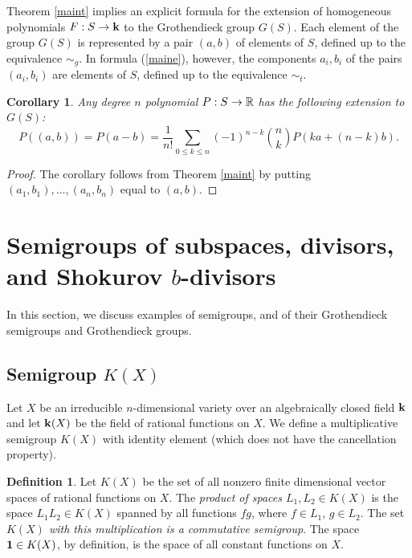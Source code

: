 \documentclass[11pt]{article}
\theoremstyle{plain}
\newtheorem{corollary}[theorem]{Corollary}
\theoremstyle{definition}
\newtheorem{definition}[theorem]{Definition}
\begin{document}
Theorem \ref{maint} implies an explicit formula for the extension of
homogeneous polynomials $F:S\to \bold k$ to the Grothendieck group
$G(S)$.  Each element of the group $G(S)$ is represented by a pair $(a,b)$ of elements of $S$, defined up to the equivalence $\sim_g$. In formula (\ref{maine}), however, the components $a_i,b_i$ of the pairs $(a_i,b_i)$ are elements of $S$, defined up to the equivalence $\sim_t$.

\begin{corollary}\label{ongindex} Any degree $n$ polynomial $P:S\to \Bbb
R$ has the following extension to~$G(S)$:
\begin{equation}\label{gindex}
P((a,b))=P(a-b)= \frac{1}{n!} \sum_{0\leq k\leq n} (-1)^{n-k}{n\choose
k}P( ka +(n-k)b).
\end{equation}

\end{corollary}

\begin{proof} The corollary  follows from Theorem \ref{maint} by putting
$(a_1,b_1),\dots,(a_n,b_n)$ equal to $(a,b)$.
\end{proof}




\section{Semigroups of  subspaces,  divisors, and Shokurov $b$-divisors}\label{sect3}

In this section, we discuss examples of semigroups, and of their Grothendieck semigroups and Grothendieck groups.


\subsection{Semigroup $K(X)$} Let $X$ be  an irreducible $n$-dimensional  variety over an algebraically closed field $\bold k$ and let  $\bold k (X)$ be the field  of rational functions on $X$. We define a  multiplicative   semigroup  $K(X)$ with identity element (which does not have the cancellation property).

\begin{definition}  Let $K(X)$ be the set   of all nonzero finite dimensional vector spaces of  rational functions on  $X$. The  {\it product of  spaces  $L_1, L_2\in K(X)$} is the space $L_1L_2\in K(X)$ spanned  by all functions $fg$, where $f\in L_1$, $g\in L_2$.
The set  {\it $K(X)$ with this multiplication is a commutative semigroup}. The space  $\bold 1\in K(X)$, by definition, is the space of all constant  functions on $X$.
\end{definition}
\end{document}
